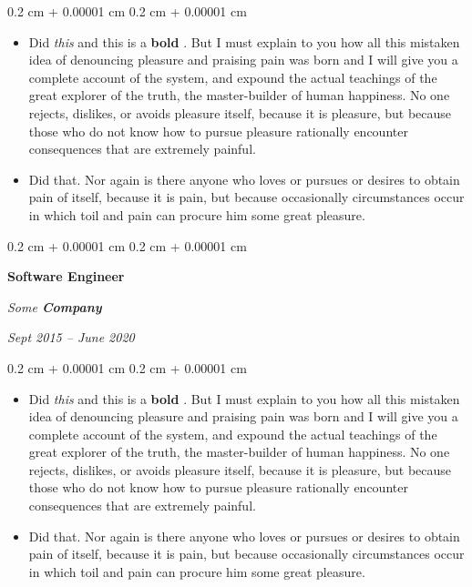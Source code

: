\documentclass[10pt, letterpaper]{article}
\newenvironment{highlights}{
    \begin{itemize}[
        topsep=0.10 cm,
        parsep=0.10 cm,
        partopsep=0pt,
        itemsep=0pt,
        leftmargin=0.4 cm + 10pt
    ]
}{
    \end{itemize}
} %
\newenvironment{onecolentry}{
    \begin{adjustwidth}{
        0.2 cm + 0.00001 cm
    }{
        0.2 cm + 0.00001 cm
    }
}{
    \end{adjustwidth}
} %
\newenvironment{twocolentry}[2][]{
    \onecolentry
    \def\secondColumn{#2}
    \setcolumnwidth{\fill, 4.5 cm}
    \begin{paracol}{2}
}{
    \switchcolumn \raggedleft \secondColumn
    \end{paracol}
    \endonecolentry
} %
\let\hrefWithoutArrow\href
\renewcommand{\href}[2]{\hrefWithoutArrow{#1}{\ifthenelse{\equal{#2}{}}{ }{#2 }\raisebox{.15ex}{\footnotesize \faExternalLink*}}}
\begin{document}
        \vspace{0.10 cm}
        \begin{onecolentry}
            \begin{highlights}
                \item Did \textit{this} and this is a \textbf{bold} \href{https://example.com}{link}. But I must explain to you how all this mistaken idea of denouncing pleasure and praising pain was born and I will give you a complete account of the system, and expound the actual teachings of the great explorer of the truth, the master-builder of human happiness. No one rejects, dislikes, or avoids pleasure itself, because it is pleasure, but because those who do not know how to pursue pleasure rationally encounter consequences that are extremely painful.
                \item Did that. Nor again is there anyone who loves or pursues or desires to obtain pain of itself, because it is pain, but because occasionally circumstances occur in which toil and pain can procure him some great pleasure.
            \end{highlights}
        \end{onecolentry}


        \vspace{0.2 cm}

        \begin{twocolentry}{
            
            
        \textit{Sept 2015 – June 2020}}
            \textbf{Software Engineer}
            
            \textit{Some \textbf{Company}}
        \end{twocolentry}

        \vspace{0.10 cm}
        \begin{onecolentry}
            \begin{highlights}
                \item Did \textit{this} and this is a \textbf{bold} \href{https://example.com}{link}. But I must explain to you how all this mistaken idea of denouncing pleasure and praising pain was born and I will give you a complete account of the system, and expound the actual teachings of the great explorer of the truth, the master-builder of human happiness. No one rejects, dislikes, or avoids pleasure itself, because it is pleasure, but because those who do not know how to pursue pleasure rationally encounter consequences that are extremely painful.
                \item Did that. Nor again is there anyone who loves or pursues or desires to obtain pain of itself, because it is pain, but because occasionally circumstances occur in which toil and pain can procure him some great pleasure.
            \end{highlights}
        \end{onecolentry}
\end{document}
